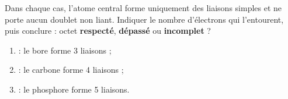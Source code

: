 \documentclass[11pt,a4paper]{article}
\begin{document}
\begin{exo}
Dans chaque cas, l'atome central forme uniquement des liaisons simples et ne porte aucun doublet
non liant. Indiquer le nombre d'électrons qui l'entourent, puis conclure : octet
\textbf{respecté}, \textbf{dépassé} ou \textbf{incomplet} ?
\begin{enumerate}[label=\alph*),leftmargin=2em,itemsep=1pt]
  \item {} : le bore forme 3 liaisons ;
  \item {} : le carbone forme 4 liaisons ;
  \item {} : le phosphore forme 5 liaisons.
\end{enumerate}
\end{exo}
\end{document}

